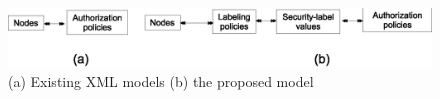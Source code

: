  
 	\begin{figure} [t]
 		\centering
 		\includegraphics[width=.9\textwidth]{NSS16/indirection}
 		\caption{(a) Existing XML models  (b) the proposed model}
 		\label{fig:indirection}
 	\end{figure}
 